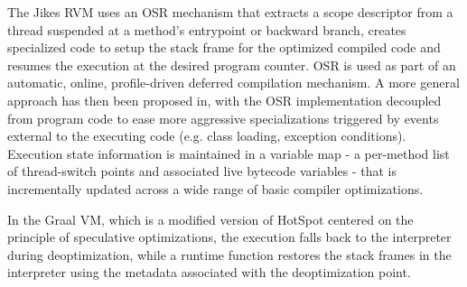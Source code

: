 The Jikes RVM uses an OSR mechanism\cite{fink2003design} that extracts a scope descriptor from a thread suspended at a method's entrypoint or backward branch, creates specialized code to setup the stack frame for the optimized compiled code and resumes the execution at the desired program counter. OSR is used as part of an automatic, online, profile-driven deferred compilation mechanism. A more general approach has then been proposed in\cite{soman2006efficient}, with the OSR implementation decoupled from program code to ease more aggressive specializations triggered by events external to the executing code (e.g. class loading, exception conditions). Execution state information is maintained in a variable map - a per-method list of thread-switch points and associated live bytecode variables - that is incrementally updated across a wide range of basic compiler optimizations.

In the Graal VM, which is a modified version of HotSpot centered on the principle of speculative optimizations, the execution falls back to the interpreter during deoptimization, while a runtime function restores the stack frames in the interpreter using the metadata associated with the deoptimization point\cite{duboscq2013graal,wurthinger2013truffle,duboscq2014metadata}.


\cite{detlefs2001method,lameed2013modular,steiner2007adaptive,chambers1992design}

  
  
  
  
  
  
  
  
  
  
  